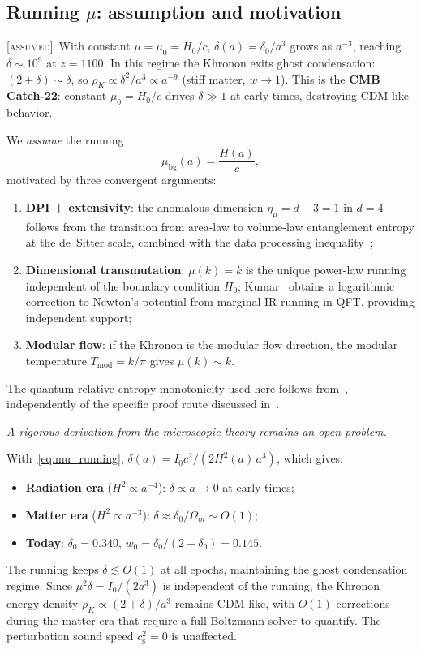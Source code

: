 \documentclass[prd,twocolumn,superscriptaddress,longbibliography,floatfix]{revtex4-2}
\newcommand{\cs}{c_{\mathrm{s}}}
\newcommand{\assumed}{\textsc{[assumed]}}
\begin{document}
\subsection{Running $\mu$: assumption and motivation}
\label{sec:running_mu}

\assumed\  With constant $\mu = \mu_0 = H_0/c$,
$\delta(a) = \delta_0/a^3$ grows as $a^{-3}$, reaching
$\delta \sim 10^9$ at $z = 1100$.  In this regime
the Khronon exits ghost condensation:
$(2{+}\delta) \sim \delta$, so
$\rho_K \propto \delta^2/a^3 \propto a^{-9}$
(stiff matter, $w \to 1$).  This is the
\textbf{CMB Catch-22}: constant $\mu_0 = H_0/c$ drives
$\delta \gg 1$ at early times, destroying CDM-like behavior.

We \emph{assume} the running
\begin{equation}
\mu_{\mathrm{bg}}(a) = \frac{H(a)}{c},
\label{eq:mu_running}
\end{equation}
motivated by three convergent arguments:
\begin{enumerate}
\item \textbf{DPI + extensivity}: the anomalous dimension
  $\eta_\mu = d - 3 = 1$ in $d = 4$ follows from the transition
  from area-law to volume-law entanglement entropy at the
  de~Sitter scale, combined with the data processing
  inequality~\cite{Verlinde2016,Jacobson2016,CasiniHuerta2017,DorauMuch2025};
\item \textbf{Dimensional transmutation}: $\mu(k) = k$ is the
  unique power-law running independent of the boundary condition
  $H_0$; Kumar~\cite{Kumar2025} obtains a logarithmic correction
  to Newton's potential from marginal IR running in QFT,
  providing independent support;
\item \textbf{Modular flow}: if the Khronon is the modular flow
  direction, the modular temperature $T_{\mathrm{mod}} = k/\pi$
  gives $\mu(k) \sim k$.
\end{enumerate}
The quantum relative entropy monotonicity used here follows from~\cite{Lindblad1975,Uhlmann1977}, independently of the specific proof route discussed in~\cite{DorauMuch2025}.

\emph{A rigorous derivation from the microscopic theory remains
an open problem.}

With~\eqref{eq:mu_running},
$\delta(a) = I_0 c^2/(2H^2(a)\,a^3)$, which gives:
\begin{itemize}
\item \textbf{Radiation era} ($H^2 \propto a^{-4}$):
  $\delta \propto a \to 0$ at early times;
\item \textbf{Matter era} ($H^2 \propto a^{-3}$):
  $\delta \approx \delta_0/\Omega_m \sim O(1)$;
\item \textbf{Today}: $\delta_0 = 0.340$,
  $w_0 = \delta_0/(2{+}\delta_0) = 0.145$.
\end{itemize}
The running keeps $\delta \lesssim O(1)$ at all epochs,
maintaining the ghost condensation regime.  Since
$\mu^2\delta = I_0/(2a^3)$ is independent of the running,
the Khronon energy density $\rho_K \propto (2{+}\delta)/a^3$
remains CDM-like, with $O(1)$ corrections during the
matter era that require a full Boltzmann solver to quantify.
The perturbation sound speed $\cs^2 = 0$ is unaffected.
\end{document}
